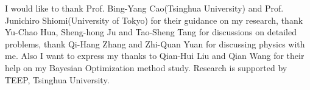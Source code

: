 
\begin{acknowledgements}      


I would like to thank Prof. Bing-Yang Cao(Tsinghua University) and Prof. Junichiro Shiomi(University of Tokyo) for their guidance on my research, thank Yu-Chao Hua, Sheng-hong Ju and Tao-Sheng Tang for discussions on detailed problems, thank  Qi-Hang Zhang and Zhi-Quan Yuan for discussing physics with me. Also I want to express my thanks to Qian-Hui Liu and Qian
Wang for their help on my Bayesian Optimization method study. Research is supported by TEEP, Tsinghua University.


\end{acknowledgements}
